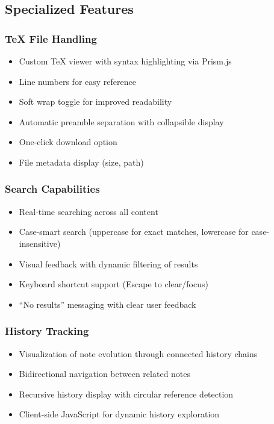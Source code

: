 \documentclass{article}
\begin{document}
\subsection{Specialized Features}

\subsubsection{TeX File Handling}
\begin{itemize}
  \item Custom TeX viewer with syntax highlighting via Prism.js
  \item Line numbers for easy reference
  \item Soft wrap toggle for improved readability
  \item Automatic preamble separation with collapsible display
  \item One-click download option
  \item File metadata display (size, path)
\end{itemize}

\subsubsection{Search Capabilities}
\begin{itemize}
  \item Real-time searching across all content
  \item Case-smart search (uppercase for exact matches, lowercase for case-insensitive)
  \item Visual feedback with dynamic filtering of results
  \item Keyboard shortcut support (Escape to clear/focus)
  \item ``No results'' messaging with clear user feedback
\end{itemize}

\subsubsection{History Tracking}
\begin{itemize}
  \item Visualization of note evolution through connected history chains
  \item Bidirectional navigation between related notes
  \item Recursive history display with circular reference detection
  \item Client-side JavaScript for dynamic history exploration
\end{itemize}
\end{document}
